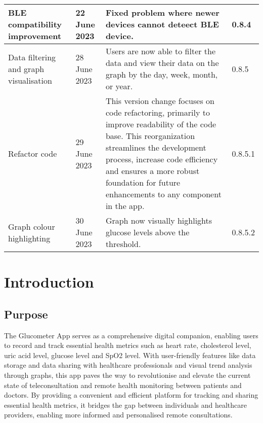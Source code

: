 \documentclass[a4paper]{scrreprt}
\begin{document}
\begin{center}
\begin{longtable}{|p{2.8cm}|l|p{7.5cm}|l|}
    \hline
    BLE compatibility improvement & 22 June 2023 & Fixed problem where newer devices cannot deteect BLE device. & 0.8.4\\
    \hline
    Data filtering and graph visualisation & 28 June 2023 & Users are now able to filter the data and view their data on the graph by the day, week, month, or year. & 0.8.5\\
    \hline
    Refactor code & 29 June 2023 & This version change focuses on code refactoring, primarily to improve readability of the code base. This reorganization streamlines the development process, increase code efficiency and ensures a more robust foundation for future enhancements to any component in the app. & 0.8.5.1\\
    \hline
    Graph colour highlighting & 30 June 2023 & Graph now visually highlights glucose levels above the threshold. & 0.8.5.2\\
    \hline
\end{longtable}
\end{center}


\tableofcontents


\chapter{Introduction}

\section{Purpose}
The Glucometer App serves as a comprehensive digital companion, enabling users to record and track essential health metrics such as heart rate, cholesterol level, uric acid level, glucose level and SpO2 level.
\newline
With user-friendly features like data storage and data sharing with healthcare professionals and visual trend analysis through graphs, this app paves the way to revolutionise and elevate the current state of teleconsultation and remote health monitoring between patients and doctors.
\newline
By providing a convenient and efficient platform for tracking and sharing essential health metrics, it bridges the gap between individuals and healthcare providers, enabling more informed and personalised remote consultations.
\end{document}
